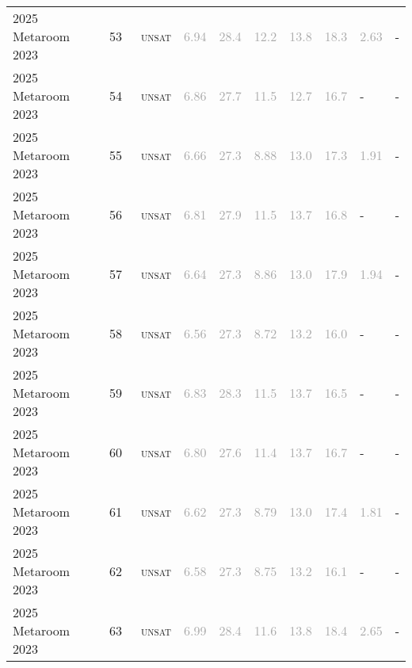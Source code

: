 \begin{center}
{\begin{longtable}{@{}llllllllll@{}}
2025 Metaroom 2023 & 53 & ~\textsc{unsat} & \textcolor{darkgray}{6.94} & \textcolor{darkgray}{28.4} & \textcolor{darkgray}{12.2} & \textcolor{darkgray}{13.8} & \textcolor{darkgray}{18.3} & \textcolor{darkgray}{2.63} & - \\
2025 Metaroom 2023 & 54 & ~\textsc{unsat} & \textcolor{darkgray}{6.86} & \textcolor{darkgray}{27.7} & \textcolor{darkgray}{11.5} & \textcolor{darkgray}{12.7} & \textcolor{darkgray}{16.7} & - & - \\
2025 Metaroom 2023 & 55 & ~\textsc{unsat} & \textcolor{darkgray}{6.66} & \textcolor{darkgray}{27.3} & \textcolor{darkgray}{8.88} & \textcolor{darkgray}{13.0} & \textcolor{darkgray}{17.3} & \textcolor{darkgray}{1.91} & - \\
2025 Metaroom 2023 & 56 & ~\textsc{unsat} & \textcolor{darkgray}{6.81} & \textcolor{darkgray}{27.9} & \textcolor{darkgray}{11.5} & \textcolor{darkgray}{13.7} & \textcolor{darkgray}{16.8} & - & - \\
2025 Metaroom 2023 & 57 & ~\textsc{unsat} & \textcolor{darkgray}{6.64} & \textcolor{darkgray}{27.3} & \textcolor{darkgray}{8.86} & \textcolor{darkgray}{13.0} & \textcolor{darkgray}{17.9} & \textcolor{darkgray}{1.94} & - \\
2025 Metaroom 2023 & 58 & ~\textsc{unsat} & \textcolor{darkgray}{6.56} & \textcolor{darkgray}{27.3} & \textcolor{darkgray}{8.72} & \textcolor{darkgray}{13.2} & \textcolor{darkgray}{16.0} & - & - \\
2025 Metaroom 2023 & 59 & ~\textsc{unsat} & \textcolor{darkgray}{6.83} & \textcolor{darkgray}{28.3} & \textcolor{darkgray}{11.5} & \textcolor{darkgray}{13.7} & \textcolor{darkgray}{16.5} & - & - \\
2025 Metaroom 2023 & 60 & ~\textsc{unsat} & \textcolor{darkgray}{6.80} & \textcolor{darkgray}{27.6} & \textcolor{darkgray}{11.4} & \textcolor{darkgray}{13.7} & \textcolor{darkgray}{16.7} & - & - \\
2025 Metaroom 2023 & 61 & ~\textsc{unsat} & \textcolor{darkgray}{6.62} & \textcolor{darkgray}{27.3} & \textcolor{darkgray}{8.79} & \textcolor{darkgray}{13.0} & \textcolor{darkgray}{17.4} & \textcolor{darkgray}{1.81} & - \\
2025 Metaroom 2023 & 62 & ~\textsc{unsat} & \textcolor{darkgray}{6.58} & \textcolor{darkgray}{27.3} & \textcolor{darkgray}{8.75} & \textcolor{darkgray}{13.2} & \textcolor{darkgray}{16.1} & - & - \\
2025 Metaroom 2023 & 63 & ~\textsc{unsat} & \textcolor{darkgray}{6.99} & \textcolor{darkgray}{28.4} & \textcolor{darkgray}{11.6} & \textcolor{darkgray}{13.8} & \textcolor{darkgray}{18.4} & \textcolor{darkgray}{2.65} & - \\

\end{longtable}}
\end{center}
